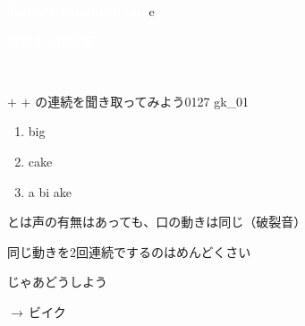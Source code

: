 \documentclass[aspectratio=169,xcolor={dvipsnames,table}]{beamer}
\begin{document}
\begin{frame}
  \centering
  \textcolor{white}{\Huge\bfseries Today's Pronunciation}e

  \vspace{30pt}

  \textcolor{white}{\Large 連続する破裂音}

  \textcolor{white}{\Large {} $+$ }
  \vfill
\end{frame}
\begin{frame}[plain]{ $+$ }
   $+$  の連続を聞き取ってみよう\hfill{\tiny 0127}\,{\scriptsize {}\,gk\_01}
  \pause
  \Large

  \begin{enumerate}[<+->]
    \item big
    \item cake
    \item a bi  ake 
  \end{enumerate}
  \bigskip
  \pause
  {とは声の有無はあっても、口の動きは同じ（破裂音）

    同じ動きを2回連続でするのはめんどくさい}\pause

  {じゃあどうしよう}\pause

  \hfill{}{$\longrightarrow$\,ビイク}

\end{frame}
\end{document}
